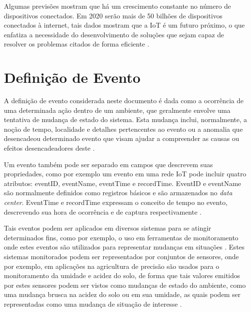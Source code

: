 \documentclass[ti,table]{texufpel} %
\begin{document}
  

  

Algumas previsões mostram que há um crescimento constante no número de dispositivos conectados. Em 2020 serão mais de 50 bilhões de dispositivos conectados à internet, tais dados mostram que a IoT é um futuro próximo, o que enfatiza a necessidade do desenvolvimento de soluções que sejam capaz de resolver os problemas citados de forma eficiente \cite{xavier2016smart}. 

  

\section{Definição de Evento} 

A definição de evento considerada neste documento é dada como a ocorrência de uma determinada ação dentro de um ambiente, que geralmente envolve uma tentativa de mudança de estado do sistema. Esta mudança inclui, normalmente, a noção de tempo, localidade e detalhes pertencentes ao evento ou a anomalia que desencadeou determinado evento que visam ajudar a compreender as causas ou efeitos desencadeadores deste \cite{fitzgerald2010common}. 

Um evento também pode ser separado em campos que descrevem suas propriedades, como por exemplo um evento em uma rede IoT pode incluir quatro atributos: eventID, eventName, eventTime e recordTime. EventID e eventName são normalmente definidos como registros básicos e são armazenados no \textit{data center}. EventTime e recordTime expressam o conceito de tempo no evento, descrevendo sua hora de ocorrência e de captura respectivamente \cite{minbo2013information}.  

  

Tais eventos podem ser aplicados em diversos sistemas para se atingir determinados fins, como por exemplo, o uso em ferramentas de monitoramento onde estes eventos são utilizados para representar mudanças em situações \cite{etzion2011event}. Estes sistemas monitorados podem ser representados por conjuntos de sensores, onde por exemplo, em aplicações na agricultura de precisão são usados para o monitoramento da umidade e acidez do solo, de forma que tais valores emitidos por estes sensores podem ser vistos como mudanças de estado do ambiente, como uma mudança brusca na acidez do solo ou em sua umidade, as quais podem ser representadas como uma mudança de situação de interesse \cite{garcia2011wireless}. 

  
\end{document}
